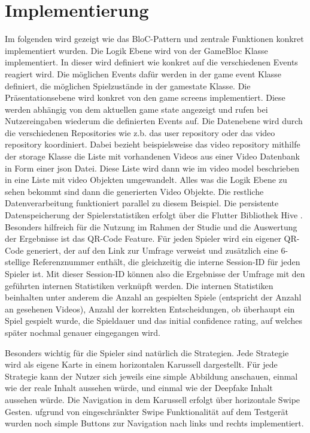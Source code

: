 \section{Implementierung} 
Im folgenden wird gezeigt wie das BloC-Pattern und zentrale Funktionen konkret implementiert wurden. 
Die Logik Ebene wird von der GameBloc Klasse implementiert. 
In dieser wird definiert wie konkret auf die verschiedenen Events reagiert wird. 
Die möglichen Events dafür werden in der game event Klasse definiert, die möglichen Spielzustände in der gamestate Klasse.
Die Präsentationsebene wird konkret von den game screens implementiert. 
Diese werden abhängig von dem aktuellen game state angezeigt und rufen bei Nutzereingaben wiederum die definierten Events auf. 
Die Datenebene wird durch die verschiedenen Repositories wie z.b. das user repository oder das video repository koordiniert. 
Dabei bezieht beispielsweise das video repository mithilfe der storage Klasse die Liste mit vorhandenen Videos aus einer Video Datenbank in Form einer json Datei. 
Diese Liste wird dann wie im video model beschrieben in eine Liste mit video Objekten umgewandelt. 
Alles was die Logik Ebene zu sehen bekommt sind dann die generierten Video Objekte. 
Die restliche Datenverarbeitung funktioniert parallel zu diesem Beispiel.
Die persistente Datenspeicherung der Spielerstatistiken erfolgt über die Flutter Bibliothek Hive \cite{IsarHive2025}. 
Besonders hilfreich für die Nutzung im Rahmen der Studie und die Auswertung der Ergebnisse ist das QR-Code Feature. 
Für jeden Spieler wird ein eigener QR-Code generiert, der auf den Link zur Umfrage verweist und zusätzlich eine 6-stellige Referenznummer enthält, 
die gleichzeitig die interne Session-ID für jeden Spieler ist. 
Mit dieser Session-ID können also die Ergebnisse der Umfrage mit den geführten internen Statistiken verknüpft werden. 
Die internen Statistiken beinhalten unter anderem die Anzahl an gespielten Spiele (entspricht der Anzahl an gesehenen Videos), 
Anzahl der korrekten Entscheidungen, ob überhaupt ein Spiel gespielt wurde, die Spieldauer und das initial confidence rating, auf welches später nochmal genauer eingegangen wird.  

Besonders wichtig für die Spieler sind natürlich die Strategien. 
Jede Strategie wird als eigene Karte in einem horizontalen Karussell dargestellt. 
Für jede Strategie kann der Nutzer sich jeweils eine simple Abbildung anschauen, einmal wie der reale Inhalt aussehen würde, und einmal wie der Deepfake Inhalt aussehen würde. 
Die Navigation in dem Karussell erfolgt über horizontale Swipe Gesten. 
ufgrund von eingeschränkter Swipe Funktionalität auf dem Testgerät wurden noch simple Buttons zur Navigation nach links und rechts implementiert.
